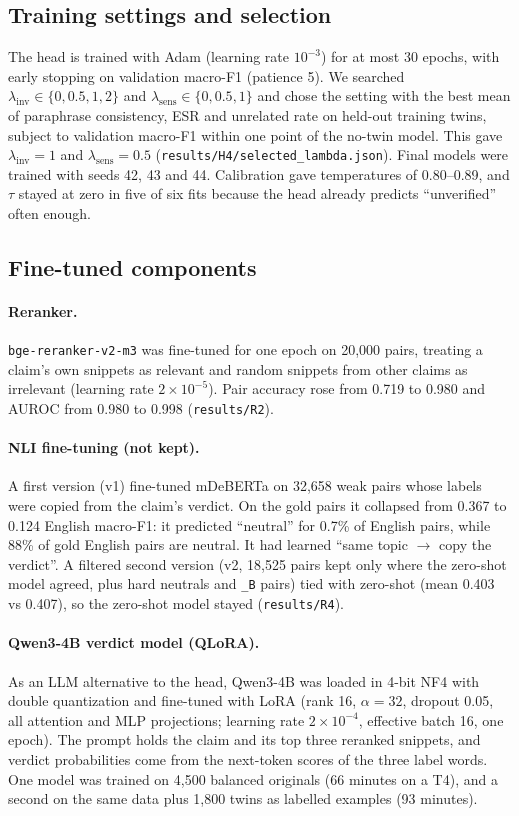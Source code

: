 \documentclass[11pt,a4paper]{article}
\newcommand{\tw}[1]{\texttt{\_#1}}          %
\begin{document}
\subsection{Training settings and selection}
The head is trained with Adam (learning rate $10^{-3}$) for at most 30 epochs, with early stopping on validation macro-F1 (patience 5). We searched $\lambda_{\text{inv}} \in \{0, 0.5, 1, 2\}$ and $\lambda_{\text{sens}} \in \{0, 0.5, 1\}$ and chose the setting with the best mean of paraphrase consistency, ESR and unrelated rate on held-out training twins, subject to validation macro-F1 within one point of the no-twin model. This gave $\lambda_{\text{inv}}=1$ and $\lambda_{\text{sens}}=0.5$ (\texttt{results/H4/selected\_lambda.json}). Final models were trained with seeds 42, 43 and 44. Calibration gave temperatures of 0.80--0.89, and $\tau$ stayed at zero in five of six fits because the head already predicts ``unverified'' often enough.

\subsection{Fine-tuned components}
\paragraph{Reranker.} \texttt{bge-reranker-v2-m3} was fine-tuned for one epoch on 20,000 pairs, treating a claim's own snippets as relevant and random snippets from other claims as irrelevant (learning rate $2\times10^{-5}$). Pair accuracy rose from 0.719 to 0.980 and AUROC from 0.980 to 0.998 (\texttt{results/R2}).

\paragraph{NLI fine-tuning (not kept).} A first version (v1) fine-tuned mDeBERTa on 32,658 weak pairs whose labels were copied from the claim's verdict. On the gold pairs it collapsed from 0.367 to 0.124 English macro-F1: it predicted ``neutral'' for 0.7\% of English pairs, while 88\% of gold English pairs are neutral. It had learned ``same topic $\rightarrow$ copy the verdict''. A filtered second version (v2, 18,525 pairs kept only where the zero-shot model agreed, plus hard neutrals and \tw{B} pairs) tied with zero-shot (mean 0.403 vs 0.407), so the zero-shot model stayed (\texttt{results/R4}).

\paragraph{Qwen3-4B verdict model (QLoRA).} As an LLM alternative to the head, Qwen3-4B was loaded in 4-bit NF4 with double quantization and fine-tuned with LoRA \citep{hu2022lora,dettmers2023qlora} (rank 16, $\alpha=32$, dropout 0.05, all attention and MLP projections; learning rate $2\times10^{-4}$, effective batch 16, one epoch). The prompt holds the claim and its top three reranked snippets, and verdict probabilities come from the next-token scores of the three label words. One model was trained on 4,500 balanced originals (66 minutes on a T4), and a second on the same data plus 1,800 twins as labelled examples (93 minutes).
\end{document}
